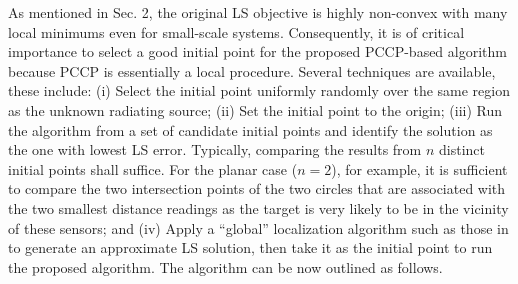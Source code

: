 As mentioned in Sec. 2, the original LS objective is highly non-convex with many local minimums even for small-scale systems. Consequently, it is of critical importance to select a good initial point for the proposed PCCP-based algorithm because PCCP is essentially a local procedure. Several techniques are available, these include: (i) Select the initial point uniformly randomly over the same region as the unknown radiating source; (ii) Set the initial point to the origin; (iii) Run the algorithm from a set of candidate initial points and identify the solution as the one with lowest LS error. Typically, comparing the results from $n$ distinct initial points shall suffice. For the planar case ($n = 2$), for example, it is sufficient to compare the two intersection points of the two circles that are associated with the two smallest distance readings as the target is very likely to be in the vicinity of these sensors; and (iv) Apply a “global” localization algorithm such as those in \cite{BeckStLi} to generate an approximate LS solution, then take it as the initial point to run the proposed algorithm. The algorithm can be now outlined as follows.

